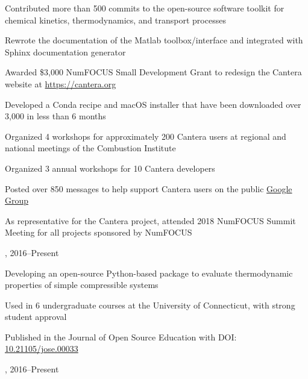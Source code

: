 \begin{innerlist}
    \item Contributed more than 500 commits to the open-source software toolkit for chemical kinetics, thermodynamics, and transport processes
    \item Rewrote the documentation of the Matlab toolbox/interface and integrated with Sphinx documentation generator
    \item Awarded \$3,000 NumFOCUS Small Development Grant to redesign the Cantera website at \url{https://cantera.org}
    \item Developed a Conda recipe and macOS installer that have been downloaded over 3,000 in less than 6 months
    \item Organized 4 workshops for approximately 200 Cantera users at regional and national meetings of the Combustion Institute
    \item Organized 3 annual workshops for 10 Cantera developers
    \item Posted over 850 messages to help support Cantera users on the public \href{https://groups.google.com/forum/#!forum/cantera-users}{Google Group}
    \item As representative for the Cantera project, attended 2018 NumFOCUS Summit Meeting for all projects sponsored by NumFOCUS
\end{innerlist}

\vspace{\baselineskip}

, \href{https://github.com/bryanwweber/thermostate}{} \hfill 2016--Present

\begin{innerlist}
    \item Developing an open-source Python-based package to evaluate thermodynamic properties of simple compressible systems
    \item Used in 6 undergraduate courses at the University of Connecticut, with strong student approval
    \item Published in the Journal of Open Source Education with DOI: \href{https://doi.org/10.21105/jose.00033}{10.21105/jose.00033}
\end{innerlist}

\vspace{\baselineskip}

, \href{https://github.com/pr-omethe-us/PyKED}{} \hfill 2016--Present

